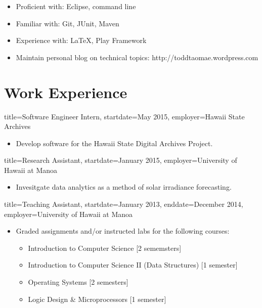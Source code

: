 \documentclass{resume}
\begin{document}
\begin{itemize}
    \item{Proficient with: Eclipse, command line}
    \item{Familiar with: Git, JUnit, Maven}
    \item{Experience with: \LaTeX, Play Framework}
\end{itemize}

\begin{itemize}
    \item{Maintain personal blog on technical topics: http://toddtaomae.wordpress.com}
\end{itemize}


\section*{Work Experience}
\begin{job}{title=Software Engineer Intern,
            startdate=May 2015,
            employer=Hawaii State Archives}
    \begin{itemize}
        \item{Develop software for the Hawaii State Digital Archives Project.}
    \end{itemize}
\end{job}

\begin{job}{title=Research Assistant,
            startdate=January 2015,
            employer=University of Hawaii at Manoa}
    \begin{itemize}
        \item{Invesitgate data analytics as a method of solar irradiance forecasting.}
    \end{itemize}
\end{job}

\begin{job}{title=Teaching Assistant,
            startdate=January 2013,
            enddate=December 2014,
            employer=University of Hawaii at Manoa}
    \begin{itemize}
        \item{Graded assignments and/or instructed labs for the following courses:}
        \begin{itemize}
            \item{Introduction to Computer Science [2 sememsters]}
            \item{Introduction to Computer Science II (Data Structures) [1 semester]}
            \item{Operating Systems [2 semesters]}
            \item{Logic Design \& Microprocessors [1 semester]}
        \end{itemize}
    \end{itemize}
\end{job}
\end{document}

